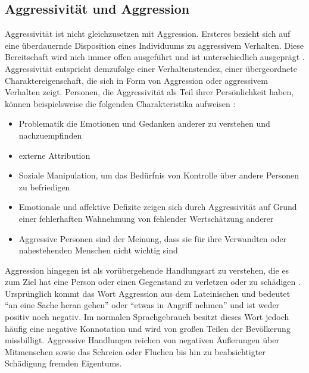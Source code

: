 \subsection{Aggressivität und Aggression}    \label{subsec_2.1.1}

Aggressivität ist nicht gleichzusetzen mit Aggression. Ersteres bezieht sich auf eine überdauernde Disposition eines Individuums zu aggressivem Verhalten. Diese Bereitschaft wird nich immer offen ausgeführt und ist unterschiedlich ausgeprägt
\parencite{Def_unterscheidung_Springer, Def_Aggressivität_Duden, Def_Aggressivität_Spektrum}. Aggressivität entspricht demzufolge einer Verhaltenstendez, einer übergeordnete Charaktereigenschaft, die sich in Form von Aggression oder aggressivem Verhalten zeigt. Personen, die Aggressivität als Teil ihrer Persönlichkeit haben, können beispielsweise die folgenden Charakteristika aufweisen \parencite{Def_Aggressivität_eng1}:
\begin{itemize} [leftmargin=1.25cm]
      \item Problematik die Emotionen und Gedanken anderer zu verstehen und nachzuempfinden
      \item externe Attribution
      \item Soziale Manipulation, um das Bedürfnis von Kontrolle über andere 
            Personen zu befriedigen
      \item Emotionale und affektive Defizite zeigen sich durch Aggressivität auf Grund einer fehlerhaften Wahnehmung von fehlender Wertschätzung anderer
      \item Aggressive Personen sind der Meinung, dass sie für ihre Verwandten oder nahestehenden Menschen nicht wichtig sind
\end{itemize}

Aggression hingegen ist als vorübergehende Handlungsart zu verstehen, die es zum Ziel hat eine Person oder einen Gegenstand zu verletzen oder zu schädigen
\parencite{Def_Aggression_1939, Def_unterscheidung_Springer, Def_Aggression_Duden}.
Ursprünglich kommt das Wort Aggression aus dem Lateinischen und bedeutet 
\enquote{an eine Sache heran gehen} oder \enquote{etwas in Angriff nehmen} \parencite{was_Aggression} und ist weder positiv noch negativ. Im normalen Sprachgebrauch besitzt dieses Wort jedoch häufig eine negative Konnotation und wird von großen Teilen der Bevölkerung missbilligt. Aggressive Handlungen reichen von negativen Äußerungen über Mitmenschen sowie das Schreien oder Fluchen bis hin zu beabsichtigter Schädigung fremden Eigentums. 

